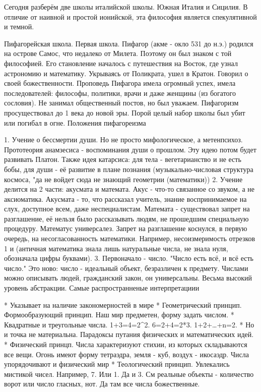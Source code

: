 Сегодня разберём две школы италийской школы. Южная Италия и Сицилия.
В отличие от наивной и простой ионийской, эта философия является спекулятивной и темной.

Пифагорейская школа.
Первая школа.
Пифагор (акме - окло 531 до н.э.) родился на острове Самос, что недалеко от Милета. Поэтому он был знаком с той философией. Его становление началось с путешествия на Восток, где узнал астрономию и математику. Укрываясь от Поликрата, ушел в Кратон. Говорил о своей божественности.
Проповедь Пифагора имела огромный успех, имела последователей: философы, политики, врачи и даже женщины (из богатого сословия). Не занимал общественный постов, но был уважаем.
Пифагоризм просуществовал до 1 века до новой эры. Порой целый набор школы был убит или погибал в огне.
Положения пифагореизма

	1. Учение о бессмертии души. Но не просто мифологическое, а метенпсихоз. Прототеория анамзесиса - воспоминания души о прошлом. Эту идею потом будет развивать Платон. Также идея катарсиса: для тела - вегетарианство и не есть бобы, для души - её развитие в плане познания (музыкально-числовая структура космоса, "да не войдет сюда не знающий геометрии (математики))
	2. Учение делится на 2 части: акусмата и математа. Акус - что-то связанное со звуком, а не аксиоматика. Акусмата - то, что рассказал учитель, знание воспринимаемое на слух, доступное всем, даже неспециалистам. Математа - существовал запрет на разглашение, её нельзя было рассказывать людям, не прошедшим специальную процедуру. Математус универсалез. Запрет на разглашение коснулся, в первую очередь, на несогласованность математики. Например, несоизмеримость отрезков 1 и  (античная математика знала лишь натуральные числа, не знала нуля, обозначала цифры буквами).
	3. Первоначало - число. "Число есть всё, и всё есть число." Это ново: число - идеальный объект, безразличен к предмету. Числами можно описывать людей, гражданский закон, он универсальны. Весьма высокий уровень абстракции. Самые распространненые интерпретациии


	* Указывает на наличие закономерностей в мире
	* Геометрический принцип. Формообразующий принцип. Наш мир предметен, форму задать числом.
	* Квадратные и треугольные числа. 1+3=4=2^2. 6=2+4=2*3. 1+2+\ldots+n=2.
	* Но и точка не материальна. Парадоксы путания физических и математических идей.
	* Физический принцп. Числа характеризуют стихии, из которых складываются все вещи. Огонь имеют форму тетраэдра, земля - куб, воздух - икосаэдр. Числа упорядочивают и физический мир
	* Теологический принцип. Увлекались мистикой чисел. Например, 7. Или 1. Да и 3. См реальные объекты - количество ворот или число гласных, нот. Да там все числа божественные.

